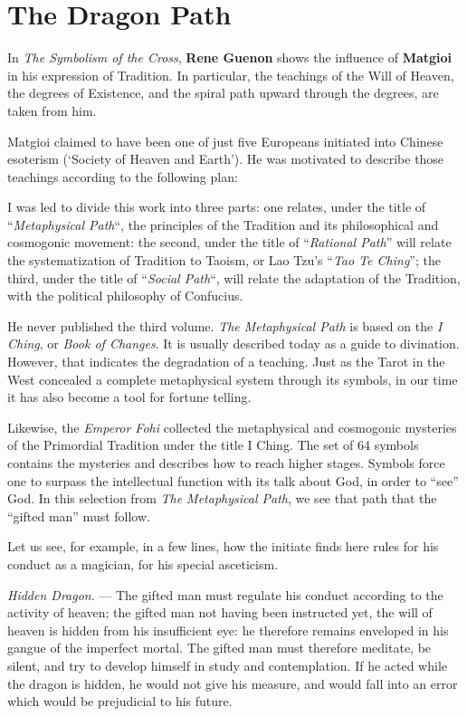\section{The Dragon Path}

In \emph{The Symbolism of the Cross}, \textbf{Rene Guenon} shows the influence of \textbf{Matgioi} in his expression of Tradition. In particular, the teachings of the Will of Heaven, the degrees of Existence, and the spiral path upward through the degrees, are taken from him.

Matgioi claimed to have been one of just five Europeans initiated into Chinese esoterism (`Society of Heaven and Earth'). He was motivated to describe those teachings according to the following plan:

\begin{quotex}
I was led to divide this work into three parts: one relates, under the title of ``\emph{Metaphysical Path}``, the principles of the Tradition and its philosophical and cosmogonic movement: the second, under the title of ``\emph{Rational Path}'' will relate the systematization of Tradition to Taoism, or Lao Tzu's ``\emph{Tao Te Ching}''; the third, under the title of ``\emph{Social Path}``, will relate the adaptation of the Tradition, with the political philosophy of Confucius.
\end{quotex}


He never published the third volume. \emph{The Metaphysical Path} is based on the \emph{I Ching}, or \emph{Book of Changes}. It is usually described today as a guide to divination. However, that indicates the degradation of a teaching. Just as the Tarot in the West concealed a complete metaphysical system through its symbols, in our time it has also become a tool for fortune telling.

Likewise, the \emph{Emperor Fohi} collected the metaphysical and cosmogonic mysteries of the Primordial Tradition under the title I Ching. The set of 64 symbols contains the mysteries and describes how to reach higher stages. Symbols force one to surpass the intellectual function with its talk about God, in order to ``see'' God. In this selection from \emph{The Metaphysical Path}, we see that path that the ``gifted man'' must follow.

Let us see, for example, in a few lines, how the initiate finds here rules for his conduct as a magician, for his special asceticism.

\emph{Hidden Dragon}. --- The gifted man must regulate his conduct according to the activity of heaven; the gifted man not having been instructed yet, the will of heaven is hidden from his insufficient eye: he therefore remains enveloped in his gangue of the imperfect mortal. The gifted man must therefore meditate, be silent, and try to develop himself in study and contemplation. If he acted while the dragon is hidden, he would not give his measure, and would fall into an error which would be prejudicial to his future.

